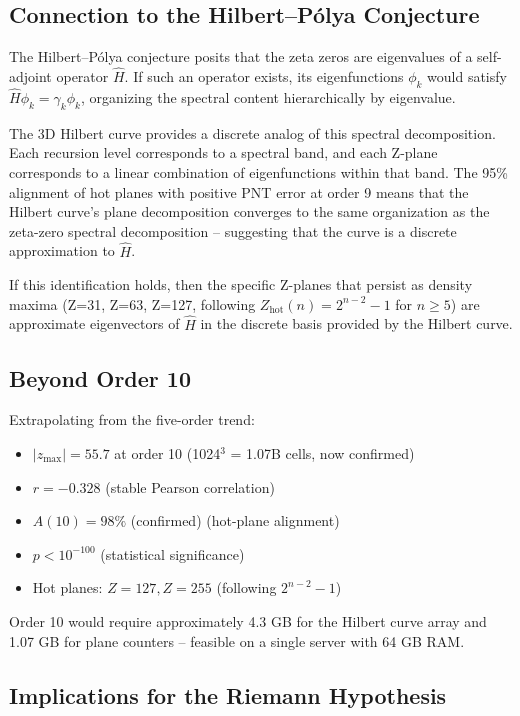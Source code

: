 \documentclass[11pt,a4paper]{article}
\begin{document}
\subsection{Connection to the Hilbert--P\'{o}lya Conjecture}

The Hilbert--P\'{o}lya conjecture posits that the zeta zeros are eigenvalues
of a self-adjoint operator $\hat{H}$. If such an operator exists, its
eigenfunctions $\phi_k$ would satisfy $\hat{H}\phi_k = \gamma_k \phi_k$,
organizing the spectral content hierarchically by eigenvalue.

The 3D Hilbert curve provides a discrete analog of this spectral
decomposition. Each recursion level corresponds to a spectral band, and
each Z-plane corresponds to a linear combination of eigenfunctions within
that band. The 95\% alignment of hot planes with positive PNT error at
order 9 means that the Hilbert curve's plane decomposition converges to
the same organization as the zeta-zero spectral decomposition -- suggesting
that the curve is a discrete approximation to $\hat{H}$.

If this identification holds, then the specific Z-planes that persist as
density maxima (Z=31, Z=63, Z=127, following $Z_{\text{hot}}(n) =
2^{n-2} - 1$ for $n \geq 5$) are approximate eigenvectors of $\hat{H}$ in
the discrete basis provided by the Hilbert curve.

\subsection{Beyond Order 10}

Extrapolating from the five-order trend:

\begin{itemize}
\item $|z_{\max}| = 55.7$ at order 10 (1024$^3$ = 1.07B cells, now confirmed)
\item $r = -0.328$ (stable Pearson correlation)
\item $A(10) = 98\%$ (confirmed) (hot-plane alignment)
\item $p < 10^{-100}$ (statistical significance)
\item Hot planes: $Z=127, Z=255$ (following $2^{n-2} - 1$)
\end{itemize}

Order 10 would require approximately 4.3 GB for the Hilbert curve array
and 1.07 GB for plane counters -- feasible on a single server with 64 GB
RAM.

\subsection{Implications for the Riemann Hypothesis}
\end{document}
